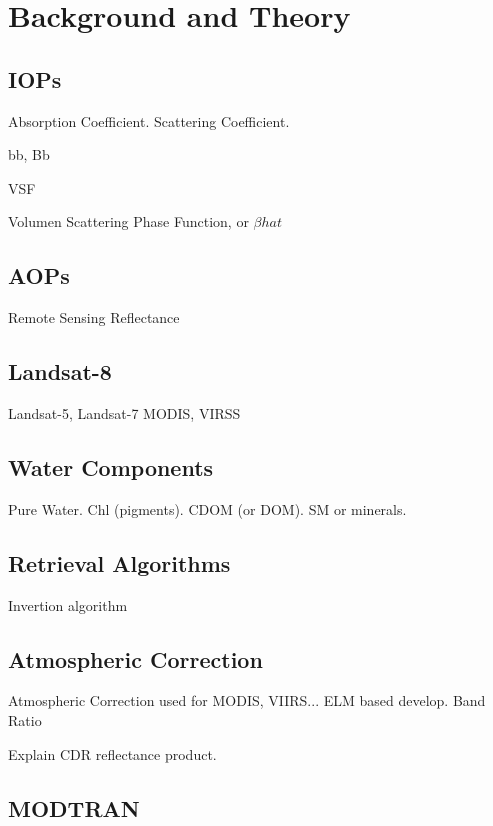 \chapter{Background and Theory}
\label{ch:background}
\section{IOPs}

Absorption Coefficient.
Scattering Coefficient.

bb, Bb

VSF

Volumen Scattering Phase Function, or $\beta{hat}$ 
\section{AOPs}
Remote Sensing Reflectance
\section{Landsat-8}
Landsat-5, Landsat-7
MODIS, VIRSS
\section{Water Components}
Pure Water. Chl (pigments). CDOM (or DOM). SM or minerals.
\section{Retrieval Algorithms}
Invertion algorithm 
\section{Atmospheric Correction}
Atmospheric Correction used for MODIS, VIIRS...
ELM based develop. Band Ratio

Explain CDR reflectance product.
\section{MODTRAN}
